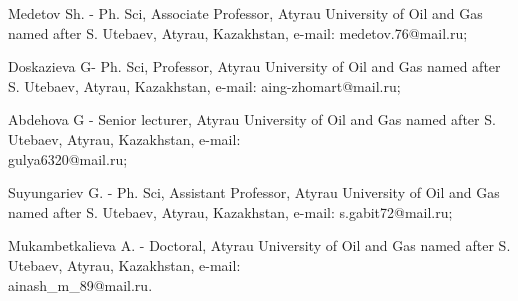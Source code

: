 \begin{authorinfo}
Medetov Sh. - Ph. Sci, Associate Professor, Atyrau Uni󠀁versity of Oil and
Gas nam󠀁ed aft󠀁er S. Ute󠀁baev, Aty󠀁rau, Kaz󠀁akhstan, e-mail: medetov.76@mail.ru;

Doskazieva G- Ph. Sci, Professor, Atyrau Uni󠀁versity of Oil and Gas nam󠀁ed
aft󠀁er S. Ute󠀁baev, Aty󠀁rau, Kaz󠀁akhstan, e-mail: aing-zhomart@mail.ru;

Abdehova G - Senior lecturer, Atyrau Uni󠀁versity of Oil and Gas
nam󠀁ed aft󠀁er S. Ute󠀁baev, Aty󠀁rau, Kaz󠀁akhstan, e-mail:\\
gulya6320@mail.ru;

Suyungariev G. - Ph. Sci, Assistant Professor, Atyrau
Uni󠀁versity of Oil and Gas nam󠀁ed aft󠀁er S. Ute󠀁baev, Aty󠀁rau, Kaz󠀁akhstan,
e-mail: s.gabit72@mail.ru;

Mukambetkalieva A. - Doctoral, Atyrau Uni󠀁versity of Oil and Gas nam󠀁ed
aft󠀁er S. Ute󠀁baev, Aty󠀁rau, Kaz󠀁akhstan, e-mail: \\ainash\_m\_89@mail.ru.
\end{authorinfo}
